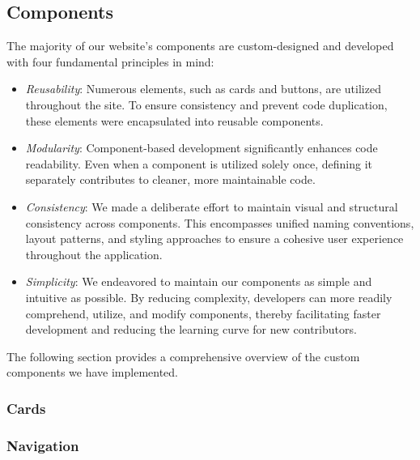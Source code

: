 \subsection{Components}


The majority of our website’s components are custom-designed and developed with four fundamental principles in mind:
\begin{itemize}
    \item \textit{Reusability}: Numerous elements, such as cards and buttons, are utilized throughout the site.
            To ensure consistency and prevent code duplication, these elements were encapsulated into reusable
            components.
    \item \textit{Modularity}: Component-based development significantly enhances code readability. Even when a component is
            utilized solely once, defining it separately contributes to cleaner, more maintainable code.
    \item \textit{Consistency}: We made a deliberate effort to maintain visual and structural consistency across components.
            This encompasses unified naming conventions, layout patterns, and styling approaches to ensure a cohesive
            user experience throughout the application.
    \item \textit{Simplicity}: We endeavored to maintain our components as simple and intuitive as possible. By reducing
            complexity, developers can more readily comprehend, utilize, and modify components, thereby facilitating
            faster development and reducing the learning curve for new contributors.
\end{itemize}

The following section provides a comprehensive overview of the custom components we have implemented.


\subsubsection{Cards}









\subsubsection{Navigation}

